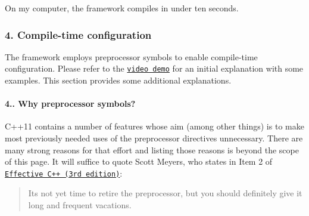 On my computer, the framework compiles in under ten seconds.\hypertarget{index_s-symbols}{}\subsubsection{4. Compile-\/time configuration}\label{index_s-symbols}
The framework employs preprocessor symbols to enable compile-\/time configuration. Please refer to the \href{https://youtu.be/cElxLWve1Zw}{\tt video demo} for an initial explanation with some examples. This section provides some additional explanations.\hypertarget{index_s-why-symbols}{}\paragraph{4.. Why preprocessor symbols?}\label{index_s-why-symbols}
{\ttfamily C++11} contains a number of features whose aim (among other things) is to make most previously needed uses of the preprocessor directives unnecessary. There are many strong reasons for that effort and listing those reasons is beyond the scope of this page. It will suffice to quote Scott Meyers, who states in {\ttfamily Item 2} of \href{http://amzn.com/0321334876}{\tt Effective C++ (3rd edition)}\+: \begin{quote}
It\textquotesingle{}s not yet time to retire the preprocessor, but you should definitely give it long and frequent vacations. \end{quote}


